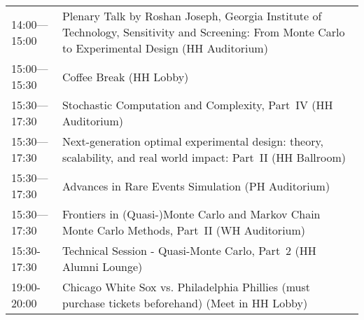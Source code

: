 \begin{table}
{\begin{tabularx}{\textwidth}{>{\hsize=0.32\hsize}X|>{\hsize=1.7\hsize}X}
\cellcolor{\PlenaryColor}14:00---15:00 & \cellcolor{\PlenaryColor}Plenary Talk by Roshan Joseph, Georgia Institute of Technology, Sensitivity and Screening: From Monte Carlo to Experimental Design (HH Auditorium) \\
\cellcolor{\EmptyColor}15:00---15:30 & \cellcolor{\EmptyColor}Coffee Break (HH Lobby) \\
\cellcolor{\SessionTitleColor}15:30---17:30 & \cellcolor{\SessionTitleColor}Stochastic Computation and Complexity, Part~IV (HH Auditorium) \\
\cellcolor{\SessionTitleColor}15:30---17:30 & \cellcolor{\SessionTitleColor}Next-generation optimal experimental design: theory, scalability, and real world impact: Part~II (HH Ballroom) \\
\cellcolor{\SessionTitleColor}15:30---17:30 & \cellcolor{\SessionTitleColor}Advances in Rare Events Simulation (PH Auditorium) \\
\cellcolor{\SessionTitleColor}15:30---17:30 & \cellcolor{\SessionTitleColor}Frontiers in (Quasi-)Monte Carlo and Markov Chain Monte Carlo Methods, Part~II (WH Auditorium) \\
\cellcolor{\SessionLightColor}15:30-17:30 & \cellcolor{\SessionLightColor}Technical Session - Quasi-Monte Carlo, Part~2 (HH Alumni Lounge) \\
\cellcolor{\SessionTitleColor}19:00-20:00 & \cellcolor{\SessionTitleColor}Chicago White Sox vs. Philadelphia Phillies (must purchase tickets beforehand) (Meet in HH Lobby) \\
\hline
\end{tabularx}
}
\end{table}

